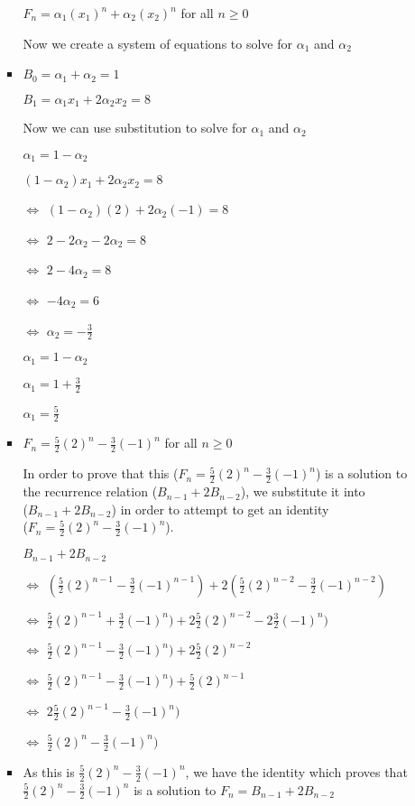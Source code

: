 \begin{enumerate}
\begin{enumerate}
\begin{itemize}
      $F_{n}=\alpha_{1}(x_{1})^{n}+\alpha_{2}(x_{2})^{n} $ for all $n\geq0$
    \item [] Now we create a system of equations to solve for $\alpha_{1}$ and $\alpha_{2}$
    \item $B_{0}=\alpha_{1}+\alpha_{2}=1$
    \item [] $B_{1}=\alpha_{1}x_{1}+2\alpha_{2}x_{2}=8$
    \item [] Now we can use substitution to solve for $\alpha_{1}$ and $\alpha_{2}$
    \item [] $\alpha_{1}=1-\alpha_{2}$
    \item [] $(1-\alpha_{2})x_{1} +2\alpha_{2}x_{2}=8$
    \item [$\Leftrightarrow$] $(1-\alpha_{2})(2) +2\alpha_{2}(-1)=8$
    \item [$\Leftrightarrow$] $2-2\alpha_{2} -2\alpha_{2}=8$
    \item [$\Leftrightarrow$] $2-4\alpha_{2}=8$
    \item [$\Leftrightarrow$] $-4\alpha_{2}=6$
    \item [$\Leftrightarrow$] $\alpha_{2}=-\frac{3}{2}$
    \item [] $\alpha_{1}=1-\alpha_{2}$
    \item [] $\alpha_{1}=1+\frac{3}{2}$
    \item [] $\alpha_{1}=\frac{5}{2}$
    \item $F_{n}=\frac{5}{2}(2)^{n}-\frac{3}{2}(-1)^{n} $ for all $n\geq0$
    \item [] In order to prove that this ($F_{n}=\frac{5}{2}(2)^{n}-\frac{3}{2}(-1)^{n}$) is a solution to the recurrence relation ($B_{n-1}+2B_{n-2}$), we substitute it into \\($B_{n-1}+2B_{n-2}$) in order to attempt to get an identity \\($F_{n}=\frac{5}{2}(2)^{n}-\frac{3}{2}(-1)^{n}$).
    \item [] $B_{n-1}+2B_{n-2}$
    \item [$\Leftrightarrow$] $(\frac{5}{2}(2)^{n-1}-\frac{3}{2}(-1)^{n-1})+2(\frac{5}{2}(2)^{n-2}-\frac{3}{2}(-1)^{n-2})$
    \item [$\Leftrightarrow$] $\frac{5}{2}(2)^{n-1}+\frac{3}{2}(-1)^{n})+2\frac{5}{2}(2)^{n-2}-2\frac{3}{2}(-1)^{n})$
    \item [$\Leftrightarrow$] $\frac{5}{2}(2)^{n-1}-\frac{3}{2}(-1)^{n})+2\frac{5}{2}(2)^{n-2}$
    \item [$\Leftrightarrow$] $\frac{5}{2}(2)^{n-1}-\frac{3}{2}(-1)^{n})+\frac{5}{2}(2)^{n-1}$
    \item [$\Leftrightarrow$] $2\frac{5}{2}(2)^{n-1}-\frac{3}{2}(-1)^{n})$
    \item [$\Leftrightarrow$] $\frac{5}{2}(2)^{n}-\frac{3}{2}(-1)^{n})$
    \item As this is $\frac{5}{2}(2)^{n}-\frac{3}{2}(-1)^{n}$, we have the identity which proves that $\frac{5}{2}(2)^{n}-\frac{3}{2}(-1)^{n}$ is a solution to $F_{n}=B_{n-1}+2B_{n-2}$
    \end{itemize}
  \end{enumerate}
\end{enumerate}

